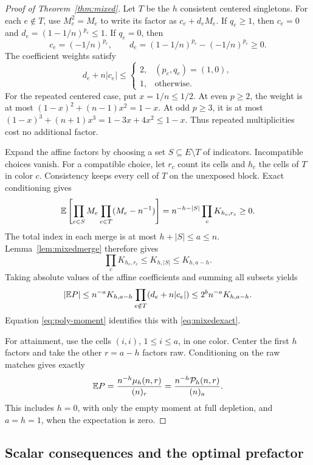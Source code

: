 \begin{proof}[Proof of Theorem~\ref{thm:mixed}]
Let $T$ be the $h$ consistent centered singletons. For each $e\notin T$, use $M_e^2=M_e$ to write its factor as $c_e+d_eM_e$. If $q_e\ge1$, then $c_e=0$ and $d_e=(1-1/n)^{p_e}\le1$. If $q_e=0$, then
\[
c_e=(-1/n)^{p_e},\qquad
d_e=(1-1/n)^{p_e}-(-1/n)^{p_e}\ge0.
\]
The coefficient weights satisfy
\begin{equation}\label{eq:weights}
d_e+n|c_e|\le
\begin{cases}
2,&(p_e,q_e)=(1,0),\\
1,&\text{otherwise}.
\end{cases}
\end{equation}
For the repeated centered case, put $x=1/n\le1/2$. At even $p\ge2$, the weight is at most
$(1-x)^2+(n-1)x^2=1-x$. At odd $p\ge3$, it is at most
$(1-x)^3+(n+1)x^3=1-3x+4x^2\le1-x$.
Thus repeated multiplicities cost no additional factor.

Expand the affine factors by choosing a set $S\subseteq E\setminus T$ of indicators. Incompatible choices vanish. For a compatible choice, let $r_c$ count its cells and $h_c$ the cells of $T$ in color $c$. Consistency keeps every cell of $T$ on the unexposed block. Exact conditioning gives
\begin{equation}\label{eq:prescribed}
\mathbb E\left[\prod_{e\in S}M_e
\prod_{e\in T}(M_e-n^{-1})\right]
=n^{-h-|S|}\prod_cK_{h_c,r_c}\ge0.
\end{equation}
The total index in each merge is at most $h+|S|\le a\le n$. Lemma~\ref{lem:mixedmerge} therefore gives
\[
\prod_cK_{h_c,r_c}\le K_{h,|S|}\le K_{h,a-h}.
\]
Taking absolute values of the affine coefficients and summing all subsets yields
\[
|\mathbb E P|\le n^{-a}K_{h,a-h}
\prod_{e\notin T}(d_e+n|c_e|)
\le 2^b n^{-a}K_{h,a-h}.
\]
Equation \eqref{eq:poly-moment} identifies this with \eqref{eq:mixedexact}.

For attainment, use the cells $(i,i)$, $1\le i\le a$, in one color. Center the first $h$ factors and take the other $r=a-h$ factors raw. Conditioning on the raw matches gives exactly
\[
\mathbb E P=\frac{n^{-h}\mu_h(n,r)}{(n)_r}
=\frac{n^{-h}\mathcal P_h(n,r)}{(n)_a}.
\]
This includes $h=0$, with only the empty moment at full depletion, and $a=h=1$, when the expectation is zero.
\end{proof}

\subsection{Scalar consequences and the optimal prefactor}

